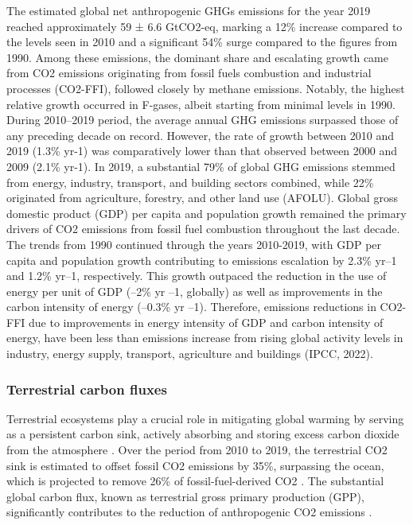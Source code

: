 The estimated global net anthropogenic GHGs emissions for the year 2019 reached approximately 59 ± 6.6 GtCO2-eq, marking a 12\% increase compared to the levels seen in 2010 and a significant 54\% surge compared to the figures from 1990. Among these emissions, the dominant share and escalating growth came from CO2 emissions originating from fossil fuels combustion and industrial processes (CO2-FFI), followed closely by methane emissions. Notably, the highest relative growth occurred in F-gases, albeit starting from minimal levels in 1990. During 2010–2019 period, the average annual GHG emissions surpassed those of any preceding decade on record. However, the rate of growth between 2010 and 2019 (1.3\% yr-1) was comparatively lower than that observed between 2000 and 2009 (2.1\% yr-1). In 2019, a substantial 79\% of global GHG emissions stemmed from energy, industry, transport, and building sectors combined, while 22\% originated from agriculture, forestry, and other land use (AFOLU). Global gross domestic product (GDP) per capita and population growth remained the primary drivers of CO2 emissions from fossil fuel combustion throughout the last decade. The trends from 1990 continued through the years 2010-2019, with GDP per capita and population growth contributing to emissions escalation by 2.3\% yr–1 and 1.2\% yr–1, respectively. This growth outpaced the reduction in the use of energy per unit of GDP (–2\% yr –1, globally) as well as improvements in the carbon intensity of energy (–0.3\% yr –1). Therefore, emissions reductions in CO2-FFI due to improvements in energy intensity of GDP and carbon intensity of energy, have been less than emissions increase from rising global activity levels in industry, energy supply, transport, agriculture and buildings (IPCC, 2022). \par

\subsubsection{Terrestrial carbon fluxes}

Terrestrial ecosystems play a crucial role in mitigating global warming by serving as a persistent carbon sink, actively absorbing and storing excess carbon dioxide from the atmosphere \citep{pan2011large}. Over the period from 2010 to 2019, the terrestrial CO2 sink is estimated to offset fossil CO2 emissions by 35\%, surpassing the ocean, which is projected to remove 26\% of fossil-fuel-derived CO2 \citep{friedlingstein2020global, wang2022disentangling}. The substantial global carbon flux, known as terrestrial gross primary production (GPP), significantly contributes to the reduction of anthropogenic CO2 emissions \citep{beer2010terrestrial}. \par

